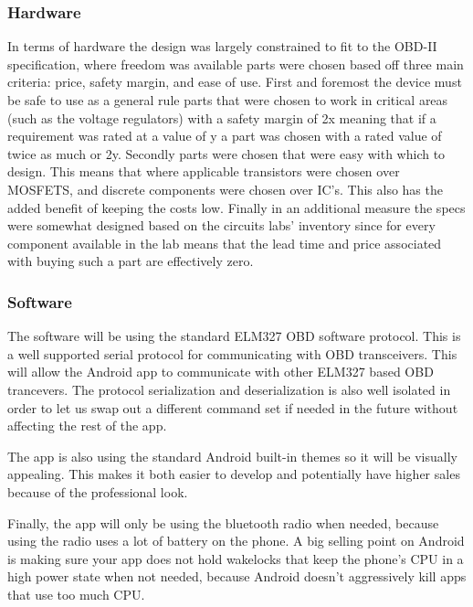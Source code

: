 \documentclass[12pt,letterpaper]{article}
\begin{document}
\subsubsection{Hardware}
In terms of hardware the design was largely constrained to fit to the OBD-II specification, where freedom was available parts were chosen based off three main criteria: price, safety margin, and ease of use. First and foremost the device must be safe to use as a general rule parts that were chosen to work in critical areas (such as the voltage regulators) with a safety margin of 2x meaning that if a requirement was rated at a value of y a part was chosen with a rated value of twice as much or 2y. Secondly parts were chosen that were easy with which to design. This means that where applicable transistors were chosen over MOSFETS, and discrete components were chosen over IC's. This also has the added benefit of keeping the costs low. Finally in an additional measure the specs were somewhat designed based on the circuits labs' inventory since for every component available in the lab means that the lead time and price associated with buying such a part are effectively zero. \\


\subsubsection{Software}
The software will be using the standard ELM327 OBD software protocol. This is a well supported serial protocol for communicating with OBD transceivers. This will allow the Android app to communicate with other ELM327 based OBD trancevers. The protocol serialization and deserialization is also well isolated in order to let us swap out a different command set if needed in the future without affecting the rest of the app. 

The app is also using the standard Android built-in themes so it will be visually appealing. This makes it both easier to develop and potentially have higher sales because of the professional look. 

Finally, the app will only be using the bluetooth radio when needed, because using the radio uses a lot of battery on the phone. A big selling point on Android is making sure your app does not hold wakelocks that keep the phone's CPU in a high power state when not needed, because Android doesn't aggressively kill apps that use too much CPU.
\end{document}
